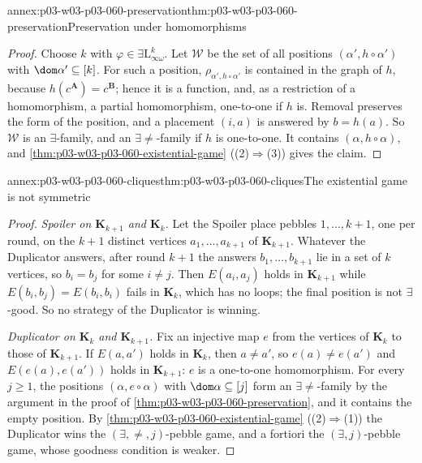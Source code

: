 \begin{annexitem}{annex:p03-w03-p03-060-preservation}{thm:p03-w03-p03-060-preservation}{Preservation under homomorphisms}
\begin{proof}
Choose \(k\) with \(\varphi\in\exists\mathrm{L}^k_{\infty\omega}\). Let
\(\mathcal W\) be the set of all positions \((\alpha',h\circ\alpha')\) with
\(\dom\alpha'\subseteq[k]\). For such a position,
\(\rho_{\alpha',h\circ\alpha'}\) is contained in the graph of \(h\),
because \(h(c^{\mathbf A})=c^{\mathbf B}\); hence it is a function, and,
as a restriction of a homomorphism, a partial homomorphism, one-to-one if
\(h\) is. Removal preserves the form of the position, and a placement
\((i,a)\) is answered by \(b=h(a)\). So \(\mathcal W\) is an
\(\exists\)-family, and an \(\exists{\neq}\)-family if \(h\) is one-to-one.
It contains \((\alpha,h\circ\alpha)\), and
\cref{thm:p03-w03-p03-060-existential-game} ((2)\(\Rightarrow\)(3)) gives
the claim.
\end{proof}
\end{annexitem}

\begin{annexitem}{annex:p03-w03-p03-060-cliques}{thm:p03-w03-p03-060-cliques}{The existential game is not symmetric}
\begin{proof}
\emph{Spoiler on \(\mathbf K_{k+1}\) and \(\mathbf K_k\).} Let the Spoiler
place pebbles \(1,\ldots,k+1\), one per round, on the \(k+1\) distinct
vertices \(a_1,\ldots,a_{k+1}\) of \(\mathbf K_{k+1}\). Whatever the
Duplicator answers, after round \(k+1\) the answers
\(b_1,\ldots,b_{k+1}\) lie in a set of \(k\) vertices, so \(b_i=b_j\) for
some \(i\neq j\). Then \(E(a_i,a_j)\) holds in \(\mathbf K_{k+1}\) while
\(E(b_i,b_j)=E(b_i,b_i)\) fails in \(\mathbf K_k\), which has no loops;
the final position is not \(\exists\)-good. So no strategy of the
Duplicator is winning.

\emph{Duplicator on \(\mathbf K_k\) and \(\mathbf K_{k+1}\).} Fix an
injective map \(e\) from the vertices of \(\mathbf K_k\) to those of
\(\mathbf K_{k+1}\). If \(E(a,a')\) holds in \(\mathbf K_k\), then
\(a\neq a'\), so \(e(a)\neq e(a')\) and \(E(e(a),e(a'))\) holds in
\(\mathbf K_{k+1}\): \(e\) is a one-to-one homomorphism. For every
\(j\ge1\), the positions \((\alpha,e\circ\alpha)\) with
\(\dom\alpha\subseteq[j]\) form an \(\exists{\neq}\)-family by the argument
in the proof of \cref{thm:p03-w03-p03-060-preservation}, and it contains
the empty position. By \cref{thm:p03-w03-p03-060-existential-game}
((2)\(\Rightarrow\)(1)) the Duplicator wins the \((\exists,\neq,j)\)-pebble
game, and a fortiori the \((\exists,j)\)-pebble game, whose goodness
condition is weaker.
\end{proof}
\end{annexitem}

